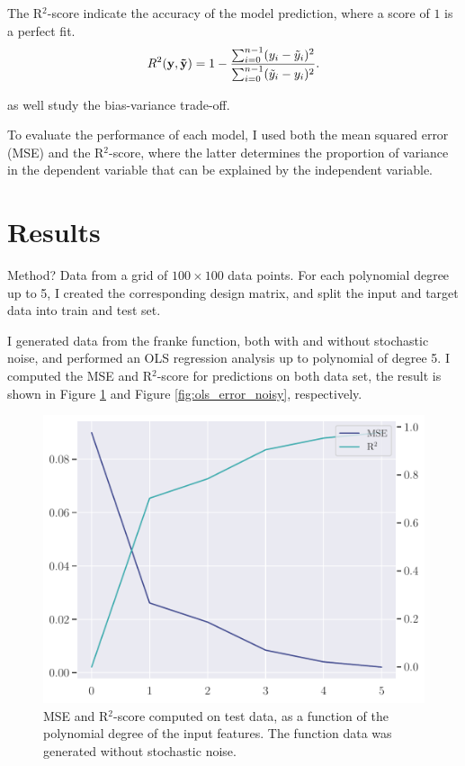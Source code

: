 The R$^{2}$-score indicate the accuracy of the model prediction, where a score of $1$ is a perfect fit.
\begin{equation}\label{eq:r2}
    R^{2}(\mathbf{y}, \mathbf{\Tilde{y}}) = 1 - \frac{\sum_{i=0}^{n-1} (y_{i} - \Tilde{y}_{i})^{2}}{\sum_{i=0}^{n-1} (\Tilde{y}_{i} - y_{i})^{2}}.
\end{equation}

as well study the bias-variance trade-off. 

To evaluate the performance of each model, I used both the mean squared error (MSE) and the R$^{2}$-score, where the latter determines the proportion of variance in the dependent variable that can be explained by the independent variable.



\section{Results}\label{sec:results}
Method? Data from a grid of $100 \times 100$ data points. For each polynomial degree up to 5, I created the corresponding design matrix, and split the input and target data into train and test set.

I generated data from the franke function, both with and without stochastic noise, and performed an OLS regression analysis up to polynomial of degree 5. I computed the MSE and R$^{2}$-score for predictions on both data set, the result is shown in Figure \ref{fig:ols_error} and Figure \ref{fig:ols_error_noisy}, respectively.
\begin{figure}
    \centering
    \includegraphics[width=0.8\linewidth]{project-1/latex/figures/ols_error.pdf}
    \caption{MSE and R$^{2}$-score computed on test data, as a function of the polynomial degree of the input features. The function data was generated without stochastic noise.}
    \label{fig:ols_error}
\end{figure}

